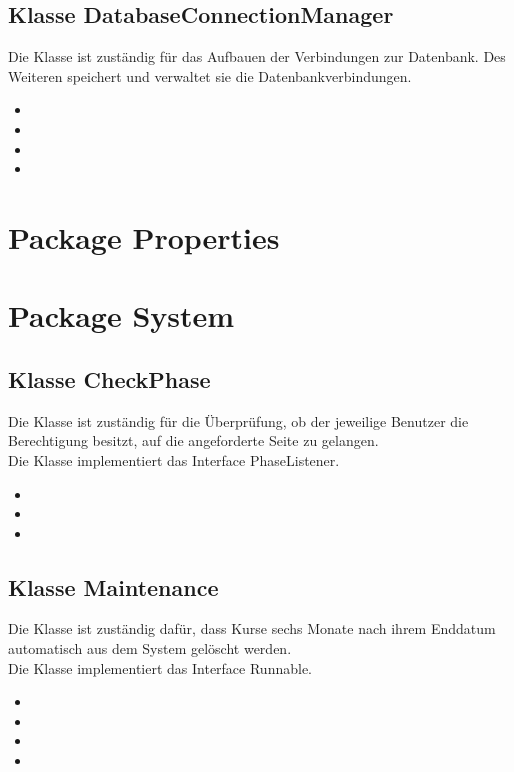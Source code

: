 \documentclass[a4paper]{scrreprt}
\begin{document}
	\subsection{Klasse DatabaseConnectionManager}
	Die Klasse ist zuständig für das Aufbauen der Verbindungen zur Datenbank. Des Weiteren
	speichert und verwaltet sie die Datenbankverbindungen. 
	\begin{itemize}
		\item {}
		\item {}
		\item {}
		\item {}
		
	\end{itemize}
	\section{Package Properties}
	
	\section{Package System}
	
		\subsection{Klasse CheckPhase}
		Die Klasse ist zuständig für die Überprüfung, ob der jeweilige Benutzer die Berechtigung besitzt, auf die angeforderte Seite zu gelangen.\\
		Die Klasse implementiert das Interface PhaseListener.
		\begin{itemize}
			\item {}
			\item \override
			\item \override
		\end{itemize}
		
		\subsection{Klasse Maintenance}
		Die Klasse ist zuständig dafür, dass Kurse sechs Monate nach ihrem Enddatum automatisch aus dem System gelöscht werden.\\
		Die Klasse implementiert das Interface Runnable.
		\begin{itemize}
			\item {}
		 	\item {}
		 	\item {}
		 	\item \override
		\end{itemize}
		
\end{document}
